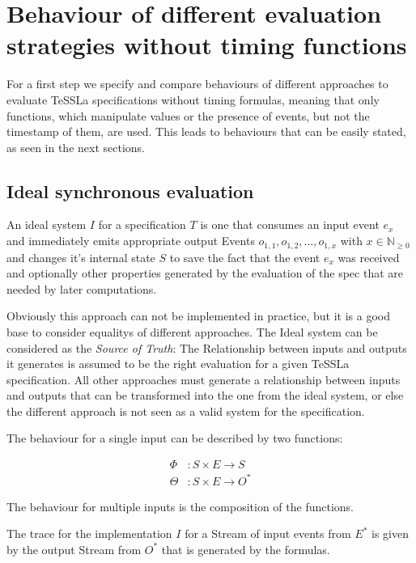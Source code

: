 \section{Behaviour of different evaluation strategies without timing functions}
\label{sec:concepts:behaviour_without_timing}

For a first step we specify and compare behaviours of different approaches to evaluate TeSSLa specifications without timing formulas,
meaning that only functions, which manipulate values or the presence of events, but not the timestamp of them, are used.
This leads to behaviours that can be easily stated, as seen in the next sections.

\subsection{Ideal synchronous evaluation}
\label{sec:concepts:behaviour_without_timing:ideal}

An ideal system \(I\) for a specification \(T\) is one that consumes an input event \(e_x\) and immediately emits
appropriate output Events \(o_{1,1}, o_{1,2}, \dots , o_{1,x}\) with \(x \in \mathbb{N}_{\ge0}\) and changes it's internal
state \(S\) to save the fact that the event \(e_x\) was received and optionally other properties generated by the
evaluation of the spec that are needed by later computations.

Obviously this approach can not be implemented in practice, but it is a good base to consider equalitys of different approaches.
The Ideal system can be considered as the \emph{Source of Truth}: The Relationship between inputs and outputs it generates
is assumed to be the right evaluation for a given TeSSLa specification.
All other approaches must generate a relationship between inputs and outputs that can be transformed into the one from the ideal system,
or else the different approach is not seen as a valid system for the specification.

The behaviour for a single input can be described by two functions:

\begin{align*}
  \Phi&: S \times E \rightarrow S \\
  \Theta&: S \times E \rightarrow O^*
\end{align*}

The behaviour for multiple inputs is the composition of the functions.

The trace for the implementation \(I\) for a Stream of input events from \(E^*\) is given by the output Stream
from \(O^*\) that is generated by the formulas.

